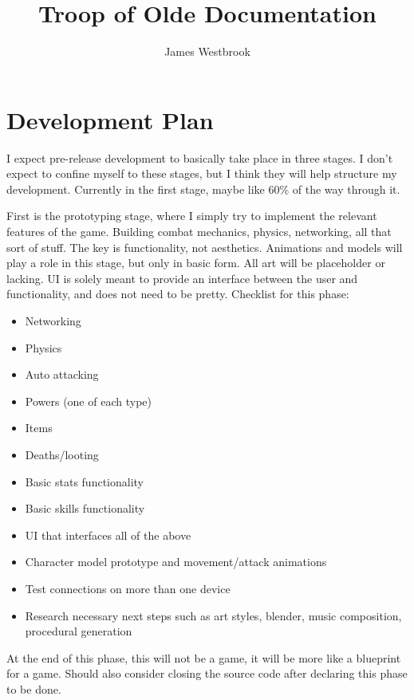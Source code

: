 \documentclass{article}
\title{Troop of Olde Documentation}
\author{James Westbrook}
\begin{document}
\maketitle

\tableofcontents

\pagebreak

\section{Development Plan}
I expect pre-release development to basically take place in three stages.
I don't expect to confine
myself to these stages, but I think they will help structure my development. Currently
in the first stage, maybe like 60\% of the way through it.

First is the prototyping stage, where I simply try to implement the relevant features
of the game. Building combat mechanics, physics, networking, all that sort of stuff.
The key is functionality, not aesthetics. Animations and models will play a role in this stage,
but only in basic form. All art will be placeholder or lacking. UI is solely meant to provide an
interface between the user and functionality, and does not need to be pretty.
Checklist for this phase:
\begin{itemize}
    \item Networking
    \item Physics
    \item Auto attacking
    \item Powers (one of each type)
    \item Items
    \item Deaths/looting
    \item Basic stats functionality
    \item Basic skills functionality
    \item UI that interfaces all of the above
    \item Character model prototype and movement/attack animations
    \item Test connections on more than one device
    \item Research necessary next steps such as art styles, blender,
    music composition, procedural generation
\end{itemize}
At the end of this phase, this will not be a game, it will be more like a blueprint for a game.
Should also consider closing the source code after declaring this phase to be done.
\end{document}
